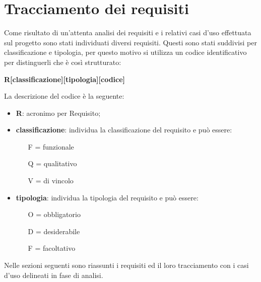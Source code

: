 \section{Tracciamento dei requisiti}
\label{bsec:tracciamento-requisiti}

Come risultato di un'attenta analisi dei requisiti e i relativi casi d'uso effettuata sul progetto sono stati individuati diversi requisiti. Questi sono stati suddivisi per classificazione e tipologia, per questo motivo si utilizza un codice identificativo per distinguerli che è così strutturato:
\begin{center}
	\textbf{R[classificazione][tipologia][codice]}
\end{center}
La descrizione del codice è la seguente:
\begin{itemize}
	\item \textbf{R}: acronimo per Requisito;
	\item \textbf{classificazione}: individua la classificazione del requisito e può essere:
	\begin{itemize}
		\item [F =] funzionale
		\item [Q =] qualitativo
		\item [V =]  di vincolo
	\end{itemize}
	\item \textbf{tipologia}: individua la tipologia del requisito e può essere:
	\begin{itemize}
		\item [O =] obbligatorio
		\item [D =] desiderabile
		\item [F =] facoltativo
	\end{itemize}
\end{itemize}

Nelle sezioni seguenti sono riassunti i requisiti ed il loro tracciamento con i casi d'uso delineati in fase di analisi.

